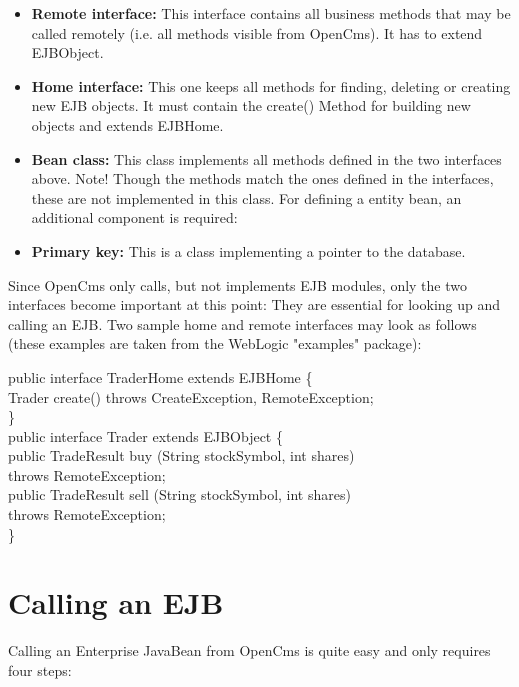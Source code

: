 \begin{itemize}
\item {\bf Remote interface:}
This interface contains all business methods that may be called remotely
(i.e. all methods visible from OpenCms). It has to extend EJBObject.

\item {\bf Home interface:}
This one keeps all methods for finding, deleting or creating new EJB
objects. It must contain the create() Method for building new objects
and extends EJBHome.

\item {\bf Bean class:}
This class implements all methods defined in the two interfaces above.
Note! Though the methods match the ones defined in the interfaces, these
are not implemented in this class.
For defining a entity bean, an additional component is required:

\item {\bf Primary key:}
This is a class implementing a pointer to the database.
\end{itemize}

Since OpenCms only calls, but not implements EJB modules, only the two
interfaces become important at this point: They are essential for
looking up and calling an EJB.
Two sample home and remote interfaces may look as follows (these
examples are taken from the WebLogic {\name "examples" package)}:

\begin{java}
public interface TraderHome extends EJBHome \{\\
\jtaba  Trader create() throws CreateException, RemoteException;\\
\}\\

public interface Trader extends EJBObject \{\\
\jtaba  public  TradeResult buy (String stockSymbol, int shares)\\
\jtabb    throws RemoteException;\\

\jtaba  public TradeResult sell (String stockSymbol, int shares)\\
\jtabb    throws RemoteException;\\
\}\\
\end{java}


\section {Calling an EJB}
Calling an Enterprise JavaBean from OpenCms is quite easy and only
requires four steps:

